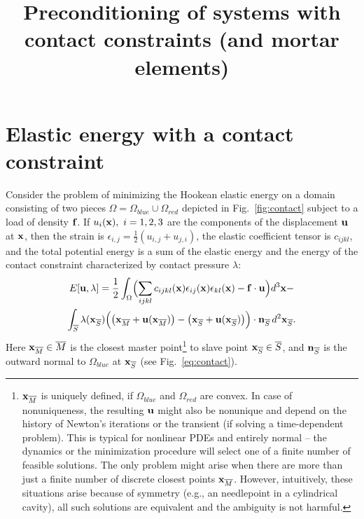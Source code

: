 \documentclass[11pt]{article}
\title{Preconditioning of systems with contact constraints (and mortar elements)}
\newcommand{\vecx}{{\bf x}}
\newcommand{\vecu}{{\bf u}}
\newcommand{\vecf}{{\bf f}}
\newcommand{\vecn}{{\bf n}}
\begin{document}
\maketitle
\section{Elastic energy with a contact constraint}
Consider the problem of minimizing the Hookean elastic energy on a domain consisting of two pieces $\Omega = \Omega_{blue}\cup \Omega_{red}$ depicted in Fig.~\ref{fig:contact}
subject to a load of density $\vecf$.
If $u_i(\vecx),\ i = 1,2,3$ are the components of the displacement $\vecu$ at $\vecx$, then the strain is $\epsilon_{i,j} = \frac{1}{2}\left(u_{i,j}+u_{j,i}\right)$,
the elastic coefficient tensor is $c_{ijkl}$, and the total potential energy is a sum of the elastic energy and the energy of the contact constraint characterized by contact pressure $\lambda$:
\begin{multline}
\label{eq:energy}
  E[\vecu,\lambda] = \frac{1}{2} \int_{\Omega} \Bigl(\sum_{ijkl}c_{ijkl}(\vecx) \epsilon_{ij}(\vecx) \epsilon_{kl}(\vecx) - \vecf \cdot \vecu\Bigr)d^3\vecx - \\
  \int_{\overline S} \lambda(\vecx_{\overline S})\Bigl(\bigl(\vecx_{\overline M}+\vecu(\vecx_{\overline M})\bigr) - \bigl(\vecx_{\overline S}+\vecu(\vecx_{\overline S})\bigr)\Bigr)\cdot\vecn_{\overline S}\, d^2\vecx_{\overline S}.
\end{multline}
Here $\vecx_{\overline M}\in \overline M$ is the closest master point\footnote{
$\vecx_{\overline M}$ is uniquely defined, if $\Omega_{blue}$ and $\Omega_{red}$ are convex.  In case of nonuniqueness, the resulting $\vecu$ might also be nonunique
and depend on the history of Newton's iterations or the transient (if solving a time-dependent problem). This is typical for nonlinear PDEs and entirely normal --
the dynamics or the minimization procedure will select one of a finite number of feasible solutions.
The only problem might arise when there are more than just a finite number of discrete closest points $\vecx_{\overline M}$.  However, intuitively, these situations
arise because of symmetry (e.g., an needlepoint in a cylindrical cavity), all such solutions are equivalent and the ambiguity is not harmful.}
to slave point $\vecx_{\overline S} \in {\overline S}$, and $\vecn_{\overline S}$ is the outward normal to $\Omega_{blue}$ at $\vecx_{\overline S}$ (see Fig.~\ref{eq:contact}).
\end{document}
